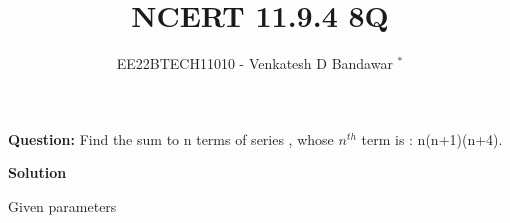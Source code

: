 \documentclass[journal,12pt,twocolumn]{IEEEtran}
\theoremstyle{remark}
\begin{document}

\vspace{3cm}

\title{NCERT 11.9.4 8Q}
\author{EE22BTECH11010 - Venkatesh D Bandawar $^{*}$%
}
\maketitle
\newpage
\bigskip

\renewcommand{\thefigure}{\theenumi}
\renewcommand{\thetable}{\theenumi}

\textbf{Question:} Find the sum to n terms of series , whose $n^{th}$ term is : n(n+1)(n+4).

\textbf{Solution}
\begin{table}[!h] 
\centering

\caption{Given parameters}
\label{given parameters list}
\end{table}
\end{document}
